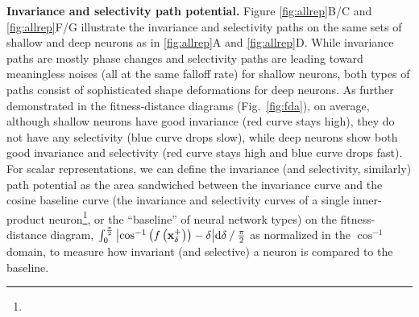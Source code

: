 \documentclass[10pt,twocolumn,letterpaper]{article}
\begin{document}
{\bf Invariance and selectivity path potential.} Figure \ref{fig:allrep}B/C and \ref{fig:allrep}F/G illustrate the invariance and selectivity paths on the same sets of shallow and deep neurons as in \ref{fig:allrep}A and \ref{fig:allrep}D.
While invariance paths are mostly phase changes and selectivity paths are leading toward meaningless noises (all at the same falloff rate) for shallow neurons, both types of paths consist of sophisticated shape deformations for deep neurons.
As further demonstrated in the fitness-distance diagrams \cite{jones1995fitness} (Fig.~\ref{fig:fda}), on average, although shallow neurons have good invariance (\ie red curve stays high), they do not have any selectivity (\ie blue curve drops slow), while deep neurons show both good invariance and selectivity (\ie red curve stays high and blue curve drops fast).
For scalar representations, we can define the invariance (and selectivity, similarly) path potential as the area sandwiched between the invariance curve and the cosine baseline curve (\ie the invariance and selectivity curves of a single inner-product neuron\footnote{}, or the ``baseline'' of neural network types) on the fitness-distance diagram, \ie $\int_{0}^{\frac{\pi}{2}}{\left| \cos^{-1}\left(f\left( \bf{x}^{+}_{\delta} \right)\right) - \delta \right|}\mathrm{d}\delta \mathbin{/} {\frac{\pi}{2}}$ as normalized in the $\cos^{-1}$ domain, to measure how invariant (and selective) a neuron is compared to the baseline.

\end{document}
